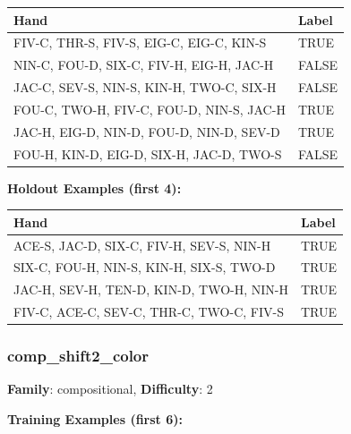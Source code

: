\documentclass[10pt,a4paper]{article}
\begin{document}
\begin{small}
\begin{tabular}{p{8cm}l}
\toprule
Hand & Label \\
\midrule
FIV-C, THR-S, FIV-S, EIG-C, EIG-C, KIN-S & \textcolor{positive}{TRUE} \\
NIN-C, FOU-D, SIX-C, FIV-H, EIG-H, JAC-H & \textcolor{negative}{FALSE} \\
JAC-C, SEV-S, NIN-S, KIN-H, TWO-C, SIX-H & \textcolor{negative}{FALSE} \\
FOU-C, TWO-H, FIV-C, FOU-D, NIN-S, JAC-H & \textcolor{positive}{TRUE} \\
JAC-H, EIG-D, NIN-D, FOU-D, NIN-D, SEV-D & \textcolor{positive}{TRUE} \\
FOU-H, KIN-D, EIG-D, SIX-H, JAC-D, TWO-S & \textcolor{negative}{FALSE} \\
\bottomrule
\end{tabular}
\end{small}

\textbf{Holdout Examples (first 4):}

\begin{small}
\begin{tabular}{p{8cm}l}
\toprule
Hand & Label \\
\midrule
ACE-S, JAC-D, SIX-C, FIV-H, SEV-S, NIN-H & \textcolor{positive}{TRUE} \\
SIX-C, FOU-H, NIN-S, KIN-H, SIX-S, TWO-D & \textcolor{positive}{TRUE} \\
JAC-H, SEV-H, TEN-D, KIN-D, TWO-H, NIN-H & \textcolor{positive}{TRUE} \\
FIV-C, ACE-C, SEV-C, THR-C, TWO-C, FIV-S & \textcolor{positive}{TRUE} \\
\bottomrule
\end{tabular}
\end{small}

\vspace{0.5cm}

\subsubsection{comp\_shift2\_color}

\textbf{Family}: compositional, \textbf{Difficulty}: 2

\textbf{Training Examples (first 6):}
\end{document}
